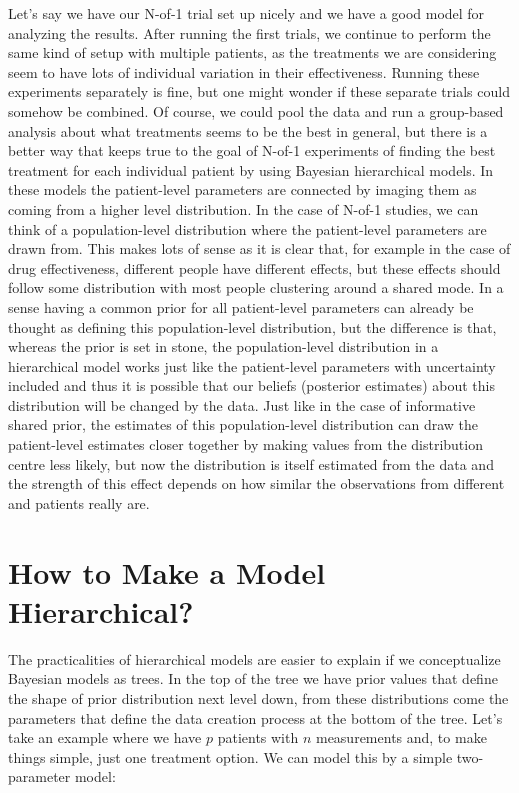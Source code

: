 \documentclass[12pt,a4paper,leqno]{report}
\theoremstyle{plain}
\theoremstyle{definition}
\theoremstyle{remark}
\begin{document}
Let's say we have our N-of-1 trial set up nicely and we have a good model for analyzing the
results. After running the first trials, we continue to perform the same kind of setup
with multiple patients, as the treatments we are considering seem to have lots of
individual variation in their effectiveness. Running these experiments separately is
fine, but one might wonder if these separate trials could somehow be combined. Of
course, we could pool the data and run a group-based
analysis about what treatments seems to be the best in general, but there is a better
way that keeps true to the goal of N-of-1 experiments of finding the best treatment for
each individual patient by using Bayesian hierarchical models. In these models the
patient-level parameters are connected by imaging them as coming from a higher level
distribution. In the case of N-of-1 studies, we can think of a population-level distribution
where the patient-level parameters are drawn from. This makes lots of sense as it is
clear that, for example in the case of drug effectiveness, different people have different
effects, but these effects should follow some distribution with most people clustering around a
shared mode. In a sense having a common prior for
all patient-level parameters can already be thought as defining this population-level
distribution, but the difference is that, whereas the prior
is set in stone, the population-level
distribution in a hierarchical model works just like the patient-level
parameters with uncertainty included and thus it is possible that our beliefs (posterior
estimates) about this distribution will be changed by the data. Just like in the case of
informative shared prior,
the estimates of this population-level distribution can draw the
patient-level estimates closer together by making values from the distribution centre less
likely, but now the distribution is itself
estimated from the data and the strength of this effect depends on how similar the
observations from different and patients really are.

\section{How to Make a Model Hierarchical?}

The practicalities of hierarchical models are easier to explain if we conceptualize
Bayesian
models as trees. In the top of the tree we have prior values that define the shape of
prior distribution next level down, from these distributions come the parameters that
define the data creation process at the bottom of the tree. Let's take an example
where we have \(p\) patients with \(n\) measurements and, to make things simple, just
one treatment option. We can model this by a simple two-parameter model:
\end{document}
